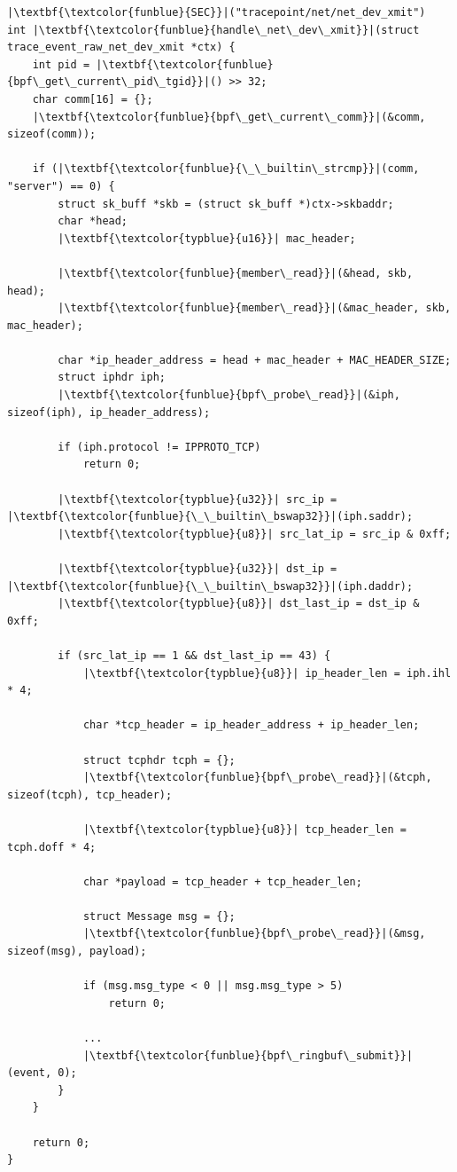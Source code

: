 \begin{listing}[H]
    \centering
\begin{verbatim}
|\textbf{\textcolor{funblue}{SEC}}|("tracepoint/net/net_dev_xmit")
int |\textbf{\textcolor{funblue}{handle\_net\_dev\_xmit}}|(struct trace_event_raw_net_dev_xmit *ctx) {
    int pid = |\textbf{\textcolor{funblue}{bpf\_get\_current\_pid\_tgid}}|() >> 32;
    char comm[16] = {};
    |\textbf{\textcolor{funblue}{bpf\_get\_current\_comm}}|(&comm, sizeof(comm));
    
    if (|\textbf{\textcolor{funblue}{\_\_builtin\_strcmp}}|(comm, "server") == 0) {
        struct sk_buff *skb = (struct sk_buff *)ctx->skbaddr;
        char *head;
        |\textbf{\textcolor{typblue}{u16}}| mac_header;

        |\textbf{\textcolor{funblue}{member\_read}}|(&head, skb, head);
        |\textbf{\textcolor{funblue}{member\_read}}|(&mac_header, skb, mac_header);

        char *ip_header_address = head + mac_header + MAC_HEADER_SIZE;
        struct iphdr iph;
        |\textbf{\textcolor{funblue}{bpf\_probe\_read}}|(&iph, sizeof(iph), ip_header_address);

        if (iph.protocol != IPPROTO_TCP)
            return 0;

        |\textbf{\textcolor{typblue}{u32}}| src_ip = |\textbf{\textcolor{funblue}{\_\_builtin\_bswap32}}|(iph.saddr);
        |\textbf{\textcolor{typblue}{u8}}| src_lat_ip = src_ip & 0xff;

        |\textbf{\textcolor{typblue}{u32}}| dst_ip = |\textbf{\textcolor{funblue}{\_\_builtin\_bswap32}}|(iph.daddr);
        |\textbf{\textcolor{typblue}{u8}}| dst_last_ip = dst_ip & 0xff;

        if (src_lat_ip == 1 && dst_last_ip == 43) {
            |\textbf{\textcolor{typblue}{u8}}| ip_header_len = iph.ihl * 4;

            char *tcp_header = ip_header_address + ip_header_len;

            struct tcphdr tcph = {};
            |\textbf{\textcolor{funblue}{bpf\_probe\_read}}|(&tcph, sizeof(tcph), tcp_header);

            |\textbf{\textcolor{typblue}{u8}}| tcp_header_len = tcph.doff * 4;

            char *payload = tcp_header + tcp_header_len;

            struct Message msg = {};
            |\textbf{\textcolor{funblue}{bpf\_probe\_read}}|(&msg, sizeof(msg), payload);

            if (msg.msg_type < 0 || msg.msg_type > 5)
                return 0;

            ...
            |\textbf{\textcolor{funblue}{bpf\_ringbuf\_submit}}|(event, 0);
        }
    }

    return 0;
}
\end{verbatim}
\caption{Handling tracepoint in BPF}
\label{lst:bpf_tracepoint}
\end{listing}


